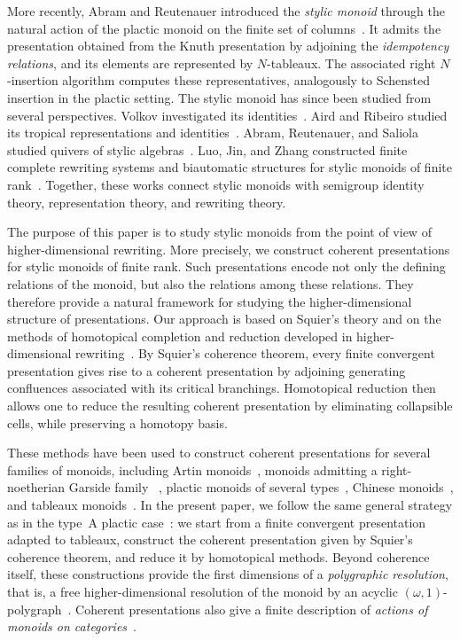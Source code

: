 \documentclass[a4paper, twoside, 11pt, english]{article}
\begin{document}
More recently, Abram and Reutenauer introduced the
\emph{stylic monoid} through the natural action of the plactic monoid on
the finite set of columns~\cite{AbramReutenauerStylic}. 
It admits the presentation obtained from the Knuth presentation by adjoining
the \emph{idempotency relations}, and its elements are represented by
$N$-tableaux. The associated right
$N$-insertion algorithm computes these representatives, analogously to
Schensted insertion in the plactic setting. The stylic monoid has since
been studied from several perspectives. Volkov investigated its
identities~\cite{Volkov2022identities}. Aird and Ribeiro studied
its tropical representations and identities~\cite{AirdRibeiro2023tropical}. Abram, Reutenauer, and Saliola studied
quivers of stylic algebras~\cite{AbramReutenauerSaliola2023Quivers}.  Luo, Jin, and Zhang
constructed finite complete rewriting systems and biautomatic
structures for stylic monoids of finite rank~\cite{LuoJinZhangStylic}. Together, these works connect stylic monoids
with semigroup identity theory, representation theory, and rewriting
theory.

The purpose of this paper is to study stylic monoids from the point of view of
higher-dimensional rewriting. More precisely, we construct coherent
presentations for stylic monoids of finite rank. Such presentations encode not
only the defining relations of the monoid, but also the relations among these
relations. They therefore provide a natural framework for studying the
higher-dimensional structure of presentations.
Our approach is based on Squier's theory and on the methods of homotopical
completion and reduction developed in higher-dimensional rewriting~\cite{GaussentGuiraudMalbos15, PolygraphsBook}. By Squier's  coherence theorem, every finite convergent
presentation gives rise to a coherent presentation by adjoining generating confluences associated with its critical branchings. Homotopical reduction
then allows one to reduce the resulting coherent presentation by eliminating
collapsible cells, while preserving a homotopy basis.


These methods have been used to construct coherent presentations for several
families of monoids, including Artin monoids~\cite{GaussentGuiraudMalbos15},
monoids admitting a right-noetherian Garside family
~\cite{CurienDuricGuiraud23}, plactic monoids of several types~\cite{HageMalbos17, Meha2021}, Chinese monoids~\cite{HageMalbos22}, and tableaux
monoids~\cite{HageTableauxMonoid}.
 In the present paper, we follow the same general strategy as in the type~A plactic case~\cite{HageMalbos17}: we
start from a finite convergent presentation adapted to tableaux, construct the
coherent presentation given by Squier's coherence theorem, and reduce it by homotopical
methods. Beyond coherence itself, these constructions provide the first
dimensions of a \emph{polygraphic resolution}, that is, a free
higher-dimensional resolution of the monoid by an acyclic
$(\omega,1)$-polygraph~\cite{GuiraudMalbos12advances,GuiraudMalbos10smf}.
Coherent presentations also give a finite description of \emph{actions of
monoids on categories}~\cite{GaussentGuiraudMalbos15}.
\end{document}
